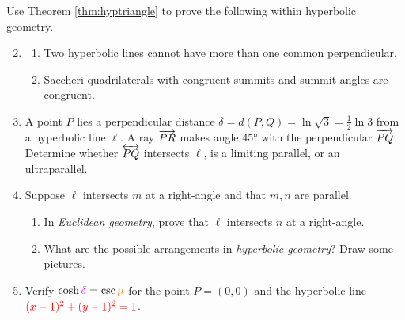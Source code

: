 \vspace{-8pt}


\goodbreak


\begin{exercises}
	\exstart Use Theorem \ref{thm:hyptriangle} to prove the following within hyperbolic geometry.\par\vspace{-2pt}
	\begin{enumerate}\setcounter{enumi}{1}
	  \item[]\begin{enumerate}
	    \item Two hyperbolic lines cannot have more than one common perpendicular.
	    \item\label{exs:saccherisummitcong} Saccheri quadrilaterals with congruent summits and summit angles are congruent.
	  \end{enumerate}
	  
	  
	  \item A point $P$ lies a perpendicular distance $\delta=d(P,Q)=\ln\sqrt 3=\frac 12\ln 3$ from a hyperbolic line $\ell$. A ray $\overrightarrow{PR}$ makes angle $\ang{45}$ with the perpendicular $\overrightarrow{PQ}$. Determine whether $\overleftrightarrow{PQ}$ intersects $\ell$, is a limiting parallel, or an ultraparallel. 
	   
	  
	  \item Suppose $\ell$ intersects $m$ at a right-angle and that $m,n$ are parallel. 
	  \begin{enumerate}
	    \item In \emph{Euclidean geometry}, prove that $\ell$ intersects $n$ at a right-angle.
			\item What are the possible arrangements in \emph{hyperbolic geometry}? Draw some pictures.
		\end{enumerate}
	  

	  \item\label{exs:coshcsc1} Verify $\cosh\textcolor{Magenta}{\delta}=\csc\textcolor{orange}{\mu}$ for the point $P=(0,0)$ and the hyperbolic line $\textcolor{red}{(x-1)^2+(y-1)^2=1}$.
	  

\end{enumerate}
\end{exercises}

